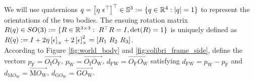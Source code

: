 We will use quaternions $q = \left [ \eta ~ \epsilon^\top \right]^\top  \in {\mathbb S}^3:=\{ q\in {\mathbb R}^4: |q| = 1\}$ to represent the orientations of the two bodies.  The ensuing rotation matrix $R(q) \in SO(3): = \{R\in {\mathbb R}^{3\times 3}: \; 
 R^\top R = I, \det (R)=1\}$ is uniquely defined as 
$R(q) := I +2\eta \left[\epsilon\right]_{\times} + 2\left[\epsilon\right]_{\times}^{2} = [R_{1}~R_{2}~R_{3}]$. \\
According to Figure \ref{fig:world_body} and \ref{fig:colibri_frame_side}, define the vectors $p_{\text{F}} = \overrightarrow{O_{\text{I}} O_{\text{F}}} $, $p_{\text{W}} = \overrightarrow{O_{\text{I}} O_{\text{W}}} $, $d_{\text{FW}} = \overrightarrow{O_{\text{F}} O_{\text{W}}} $ satisfying $d_{\text{FW}} = p_{\text{W}} - p_{\text{F}}$ and $d_{\text{M}O_{\text{W}}} = \overrightarrow{\text{M} O_{\text{W}} }$, $d_{\text{G}O_{\text{W}}} = \overrightarrow{\text{G} O_{\text{W}} }$.

